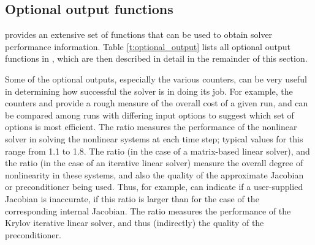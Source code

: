 \subsection{Optional output functions}\label{ss:optional_output}

{\cvodes} provides an extensive set of functions that can be used to obtain
solver performance information.
Table \ref{t:optional_output} lists all optional output functions in {\cvodes},
which are then described in detail in the remainder of this section.

Some of the optional outputs, especially the various counters, can be
very useful in determining how successful the {\cvodes} solver is in
doing its job.  For example, the counters  and 
provide a rough measure of the overall cost of a given run, and can be
compared among runs with differing input options to suggest which set
of options is most efficient.  The ratio  measures
the performance of the nonlinear solver in solving the nonlinear
systems at each time step; typical values for this range from 1.1 to
1.8.  The ratio  (in the case of a matrix-based linear
solver), and the ratio  (in the case of an
iterative linear solver) measure the overall degree of nonlinearity
in these systems, and also the quality of the approximate Jacobian or
preconditioner being used.  Thus, for example, 
can indicate if a user-supplied Jacobian is inaccurate, if this ratio
is larger than for the case of the corresponding internal Jacobian.
The ratio  measures the performance of the Krylov
iterative linear solver, and thus (indirectly) the quality of the
preconditioner.

\vspace*{.2in}

\newlength{\colAA}
\settowidth{\colAA}{No. of r.h.s. calls for finite diff. Jacobian[-vector] evals.}
\newlength{\colBB}


